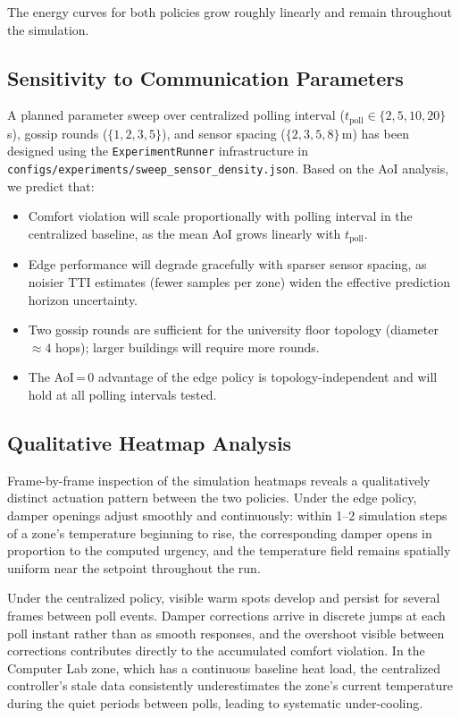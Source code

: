 \documentclass[conference]{IEEEtran}
\begin{document}
The energy curves for both policies grow roughly linearly and remain
 throughout the simulation.

\subsection{Sensitivity to Communication Parameters}

A planned parameter sweep over centralized polling interval
($t_{\text{poll}} \in \{2, 5, 10, 20\}$\,s), gossip rounds
($\{1, 2, 3, 5\}$), and sensor spacing ($\{2, 3, 5, 8\}$\,m) has been
designed using the \texttt{ExperimentRunner} infrastructure in
\texttt{configs/experiments/sweep\_sensor\_density.json}.  Based on the AoI
analysis, we predict that:
\begin{itemize}[]
  \item Comfort violation will scale proportionally with polling interval in
        the centralized baseline, as the mean AoI grows linearly with
        $t_{\text{poll}}$.
  \item Edge performance will degrade gracefully with sparser sensor
        spacing, as noisier TTI estimates (fewer samples per zone) widen
        the effective prediction horizon uncertainty.
  \item Two gossip rounds are sufficient for the university floor topology
        (diameter $\approx 4$ hops); larger buildings will require more rounds.
  \item The AoI\,=\,0 advantage of the edge policy is topology-independent
        and will hold at all polling intervals tested.
\end{itemize}

\subsection{Qualitative Heatmap Analysis}

Frame-by-frame inspection of the simulation heatmaps reveals a qualitatively
distinct actuation pattern between the two policies.  Under the edge policy,
damper openings adjust smoothly and continuously: within 1--2 simulation steps
of a zone's temperature beginning to rise, the corresponding damper opens in
proportion to the computed urgency, and the temperature field remains
spatially uniform near the setpoint throughout the run.

Under the centralized policy, visible warm spots develop and persist for
several frames between poll events.  Damper corrections arrive in discrete
jumps at each poll instant rather than as smooth responses, and the overshoot
visible between corrections contributes directly to the accumulated comfort
violation.  In the Computer Lab zone, which has a continuous baseline heat
load, the centralized controller's stale data consistently underestimates the
zone's current temperature during the quiet periods between polls, leading to
systematic under-cooling.
\end{document}
